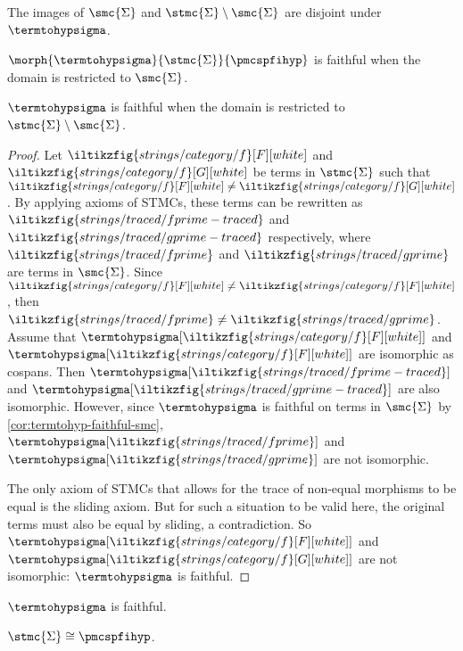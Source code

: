 \begin{corollary}
    The images of \(\smc{\Sigma}\) and \(\stmc{\Sigma} \setminus \smc{\Sigma}\)
    are disjoint under \(\termtohypsigma\).
\end{corollary}

\begin{corollary}\label{cor:termtohyp-faithful-smc}
    \(\morph{\termtohypsigma}{\stmc{\Sigma}}{\pmcspfihyp}\) is faithful when the
    domain is restricted to \(\smc{\Sigma}\).
\end{corollary}

\begin{theorem}
    \(\termtohypsigma\) is faithful when the domain is restricted to \(
        \stmc{\Sigma} \setminus \smc{\Sigma}
    \).
\end{theorem}
\begin{proof}
    Let \(
        \iltikzfig{strings/category/f}[F][white]
    \) and \(
        \iltikzfig{strings/category/f}[G][white]
    \) be terms in \(\stmc{\Sigma}\) such that \(
        \iltikzfig{strings/category/f}[F][white]
        \neq
        \iltikzfig{strings/category/f}[G][white]
    \).
    By applying axioms of STMCs, these terms can be rewritten as \(
        \iltikzfig{strings/traced/fprime-traced}
    \) and \(
        \iltikzfig{strings/traced/gprime-traced}
    \) respectively, where \(
        \iltikzfig{strings/traced/fprime}
    \) and \(
        \iltikzfig{strings/traced/gprime}
    \) are terms in \(\smc{\Sigma}\).
    Since \(
        \iltikzfig{strings/category/f}[F][white]
        \neq
        \iltikzfig{strings/category/f}[F][white]
    \), then \(
        \iltikzfig{strings/traced/fprime}
        \neq
        \iltikzfig{strings/traced/gprime}
    \).
    Assume that \(
        \termtohypsigma[\iltikzfig{strings/category/f}[F][white]]
    \) and \(
        \termtohypsigma[\iltikzfig{strings/category/f}[F][white]]
    \) are isomorphic as cospans.
    Then \(
        \termtohypsigma[\iltikzfig{strings/traced/fprime-traced}]
    \) and \(
        \termtohypsigma[\iltikzfig{strings/traced/gprime-traced}]
    \) are also isomorphic.
    However, since \(\termtohypsigma\) is faithful on terms in \(\smc{\Sigma}\)
    by \cref{cor:termtohyp-faithful-smc}, \(
        \termtohypsigma[\iltikzfig{strings/traced/fprime}]
    \) and \(
        \termtohypsigma[\iltikzfig{strings/traced/gprime}]
    \) are not isomorphic.

    The only axiom of STMCs that allows for the trace of non-equal morphisms to
    be equal is the sliding axiom.
    But for such a situation to be valid here, the original terms must also be
    equal by sliding, a contradiction.
    So \(
        \termtohypsigma[\iltikzfig{strings/category/f}[F][white]]
    \) and \(
        \termtohypsigma[\iltikzfig{strings/category/f}[G][white]]
    \) are not isomorphic: \(\termtohypsigma\) is faithful.
\end{proof}

\begin{corollary}
    \(\termtohypsigma\) is faithful.
\end{corollary}

\begin{corollary}
    \(\stmc{\Sigma} \cong \pmcspfihyp\).
\end{corollary}